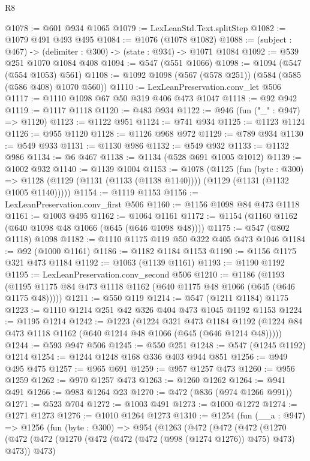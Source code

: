 \begin{lexlean}{R8}
\begin{coremodule}
@1078 := @601 @934 @1065
@1079 := LexLeanStd.Text.splitStep
@1082 := @1079 @491 @493 @495
@1084 := @1076 (@1078 @1082)
@1088 := (subject : @467) -> (delimiter : @300) -> (state : @934) -> @1071 @1084
@1092 := @539 @251 @1070 @1084 @408
@1094 := @547 (@551 @1066)
@1098 := @1094 (@547 (@554 @1053) @561)
@1108 := @1092 @1098 (@567 (@578 @251)) (@584 (@585 (@586 @408) @1070 @560))
@1110 := LexLeanPreservation.conv_let @506
@1117 := @1110 @1098 @67 @50 @319 @406 @473 @1047
@1118 := @92 @942
@1119 := @1117 @1118
@1120 := @483 @934
@1122 := @946 (fun ("_" : @947) => @1120)
@1123 := @1122 @951
@1124 := @741 @934
@1125 := @1123 @1124
@1126 := @955 @1120
@1128 := @1126 @968 @972
@1129 := @789 @934
@1130 := @549 @933
@1131 := @1130 @986
@1132 := @549 @932
@1133 := @1132 @986
@1134 := @6 @467
@1138 := @1134 (@528 @691 @1005 @1012)
@1139 := @1002 @932
@1140 := @1139 @1004
@1153 := @1078
    (@1125
      (fun (byte : @300) =>
      @1128 (@1129 (@1131 (@1133 (@1138 @1140)))) (@1129 (@1131 (@1132 @1005 @1140)))))
@1154 := @1119 @1153
@1156 := LexLeanPreservation.conv_first @506
@1160 := @1156 @1098 @84 @473 @1118
@1161 := @1003 @495
@1162 := @1064 @1161
@1172 := @1154 (@1160 @1162 (@640 @1098 @48 @1066 (@645 (@646 @1098 @48))))
@1175 := @547 (@802 @1118) @1098
@1182 := @1110 @1175 @119 @50 @322 @405 @473 @1046
@1184 := @92 (@1000 @1161)
@1186 := @1182 @1184 @1153
@1190 := @1156 @1175 @321 @473 @1184
@1192 := @1063 (@1139 @1161)
@1193 := @1190 @1192
@1195 := LexLeanPreservation.conv_second @506
@1210 := @1186
    (@1193 (@1195 @1175 @84 @473 @1118 @1162 (@640 @1175 @48 @1066 (@645 (@646 @1175 @48)))))
@1211 := @550 @119
@1214 := @547 (@1211 @1184) @1175
@1223 := @1110 @1214 @251 @42 @326 @404 @473 @1045 @1192 @1153
@1224 := @1195 @1214
@1242 := @1223
    (@1224
      @321
      @473
      @1184
      @1192
      (@1224 @84 @473 @1118 @1162 (@640 @1214 @48 @1066 (@645 (@646 @1214 @48)))))
@1244 := @593 @947 @506
@1245 := @550 @251
@1248 := @547 (@1245 @1192) @1214
@1254 := @1244 @1248 @168 @336 @403 @944 @851
@1256 := @949 @495 @475
@1257 := @965 @691
@1259 := @957 @1257 @473
@1260 := @956 @1259
@1262 := @970 @1257 @473
@1263 := @1260 @1262
@1264 := @941 @491
@1266 := @983 @1264 @23
@1270 := @472 (@836 (@974 @1266 @991))
@1271 := @523 @704
@1272 := @1003 @491
@1273 := @1000 @1272
@1274 := @1271 @1273
@1276 := @1010 @1264 @1273
@1310 := @1254
    (fun (__a : @947) =>
    @1256
      (fun (byte : @300) =>
      @954
        (@1263
          (@472
            (@472
              (@472
                (@1270
                  (@472
                    (@472 (@1270 (@472 (@472 (@472 (@998 (@1274 @1276)) @475) @473) @473)) @473)

\end{coremodule}
\end{lexlean}
